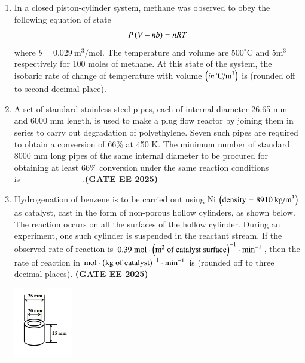 \documentclass[journal,12pt,onecolumn]{IEEEtran}
\theoremstyle{remark}
\begin{document}
\begin{enumerate}
\item In a closed piston-cylinder system, methane was observed to obey the following equation of state
\[ P\left(V-nb\right)=nRT \]
where $b=0.029~\text{m}^{3}/\text{mol}$. The temperature and volume are $500^{\circ}\text{C}$ and $5\text{m}^{3}$ respectively for 100 moles of methane. At this state of the system, the isobaric rate of change of temperature with volume $\left(in ^{\circ}\text{C/m}^{3}\right)$ is\underline{\hspace{2cm}} (rounded off to second decimal place).



\item A set of standard stainless steel pipes, each of internal diameter 26.65 mm and 6000 mm length, is used to make a plug flow reactor by joining them in series to carry out degradation of polyethylene. Seven such pipes are required to obtain a conversion of 66\% at 450 K. The minimum number of standard 8000 mm long pipes of the same internal diameter to be procured for obtaining at least 66\% conversion under the same reaction conditions is\_\_\_\_\_\_\_\_\_\_.\hfill \textbf{(GATE EE 2025)} 




\item Hydrogenation of benzene is to be carried out using Ni $\left(\text{density} = 8910~\text{kg/m}^{3}\right)$ as catalyst, cast in the form of non-porous hollow cylinders, as shown below. The reaction occurs on all the surfaces of the hollow cylinder. During an experiment, one such cylinder is suspended in the reactant stream. If the observed rate of reaction is $0.39~\text{mol}\cdot\left(\text{m}^2 \text{ of catalyst surface}\right)^{-1}\cdot\text{min}^{-1}$, then the rate of reaction in $\text{mol}\cdot\left(\text{kg of catalyst}\right)^{-1}\cdot\text{min}^{-1}$ is\underline{\hspace{2cm}} (rounded off to three decimal places). \hfill \textbf{(GATE EE 2025)} 


\begin{center}
\includegraphics[width=0.2\textwidth]{figs/52.png}
\end{center}




\end{enumerate}
\end{document}
